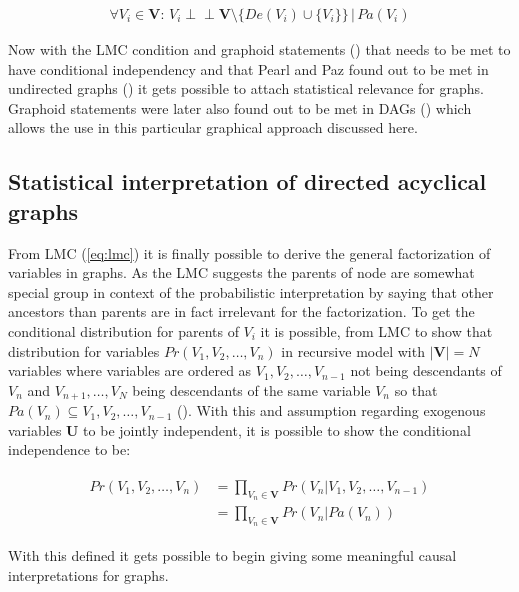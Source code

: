\documentclass[main=english,12pt,a4paper,pdftex,econ,utf8]{aaltothesis}
\newcommand{\indep}{\perp \!\!\! \perp}
\newcommand{\pa}[1]{Pa(#1)}
\newcommand{\de}[1]{De(#1)}
\newcommand{\vars}{\bm{V}}
\newcommand{\unobs}{\bm{U}}
\begin{document}
\begin{gather} \label{eq:lmc}
    \forall V_{i}\in\vars\text{: }V_{i}\indep\vars\setminus\{\de{V_{i}}\cup \{V_{i}\}\}\,|\,\pa{V_{i}}
\end{gather}

Now with the LMC condition and graphoid statements (\cite{Dawid1979}) that needs to be met to have conditional independency and that Pearl and Paz found out to be met in undirected graphs (\cite{Paz1985}) it gets possible to attach statistical relevance for graphs. Graphoid statements were later also found out to be met in DAGs (\cite{Pearl1986}) which allows the use in this particular graphical approach discussed here.

\subsection{Statistical interpretation of directed acyclical graphs}

From LMC (\ref{eq:lmc}) it is finally possible to derive the general factorization of variables in graphs. As the LMC suggests the parents of node are somewhat special group in context of the probabilistic interpretation by saying that other ancestors than parents are in fact irrelevant for the factorization. To get the conditional distribution for parents of $V_i$ it is possible, from LMC to show that distribution for variables $Pr(V_1,V_2,\ldots,V_n)$ in recursive model with $|\vars|=N$ variables where variables are ordered as $V_1,V_2,\ldots,V_{n-1}$ not being descendants of $V_n$ and $V_{n+1},\ldots,V_{N}$ being descendants of the same variable $V_n$ so that $\pa{V_n}\subseteq V_1,V_2,\ldots,V_{n-1}$ (\cite{Heckman2015}). With this and assumption regarding exogenous variables $\unobs$ to be jointly independent, it is possible to show the conditional independence to be:

\begin{align} \label{eq:factor}
    \begin{split}
        Pr(V_1,V_2,\ldots,V_{n})&=\prod_{V_{n}\in\vars}Pr(V_{n}|V_1,V_2,\ldots,V_{n-1}) \\
        &=\prod_{V_{n}\in\vars}Pr(V_{n}|\pa{V_{n}})
    \end{split}
\end{align}

\noindent With this defined it gets possible to begin giving some meaningful causal interpretations for graphs.
\end{document}
